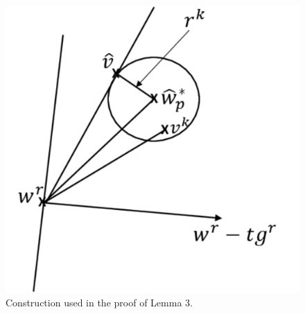 \begin{figure}
\begin{center}
\includegraphics[width=0.8\columnwidth]{figures/spherefig}
\caption{Construction used in the proof of Lemma 3.}
\end{center}
\label{spherefig}
\end{figure}


